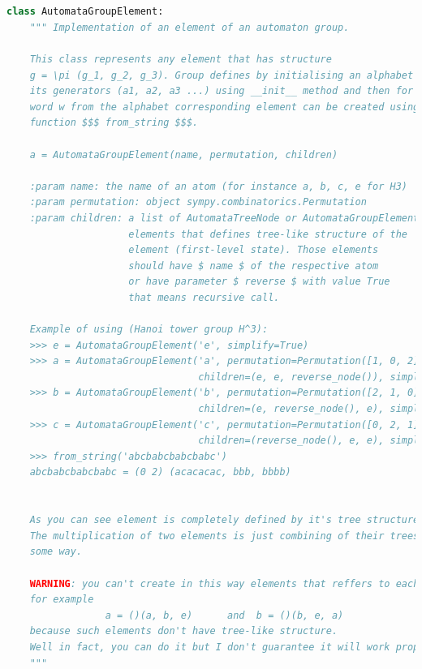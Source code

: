 \documentclass[a4paper,12pt]{amsart}
\begin{document}
\begin{appendices}
\newpage

\begin{lstlisting}[language=python, basicstyle=\tiny]


class AutomataGroupElement:
    """ Implementation of an element of an automaton group.
    
    This class represents any element that has structure 
    g = \pi (g_1, g_2, g_3). Group defines by initialising an alphabet of 
    its generators (a1, a2, a3 ...) using __init__ method and then for every 
    word w from the alphabet corresponding element can be created using 
    function $$$ from_string $$$. 
    
    a = AutomataGroupElement(name, permutation, children)    
    
    :param name: the name of an atom (for instance a, b, c, e for H3)
    :param permutation: object sympy.combinatorics.Permutation
    :param children: a list of AutomataTreeNode or AutomataGroupElement 
                     elements that defines tree-like structure of the 
                     element (first-level state). Those elements 
                     should have $ name $ of the respective atom 
                     or have parameter $ reverse $ with value True 
                     that means recursive call.
     
    Example of using (Hanoi tower group H^3):
    >>> e = AutomataGroupElement('e', simplify=True)
    >>> a = AutomataGroupElement('a', permutation=Permutation([1, 0, 2]), \
                                 children=(e, e, reverse_node()), simplify=True)
    >>> b = AutomataGroupElement('b', permutation=Permutation([2, 1, 0]), \
                                 children=(e, reverse_node(), e), simplify=True)
    >>> c = AutomataGroupElement('c', permutation=Permutation([0, 2, 1]), \
                                 children=(reverse_node(), e, e), simplify=True)
    >>> from_string('abcbabcbabcbabc')
    abcbabcbabcbabc = (0 2) (acacacac, bbb, bbbb)


    As you can see element is completely defined by it's tree structure. 
    The multiplication of two elements is just combining of their trees in 
    some way.
    
    WARNING: you can't create in this way elements that reffers to each other, 
    for example 
                 a = ()(a, b, e)      and  b = ()(b, e, a)
    because such elements don't have tree-like structure. 
    Well in fact, you can do it but I don't guarantee it will work properly.
    """
	

\end{lstlisting}
\end{appendices}
\end{document}
